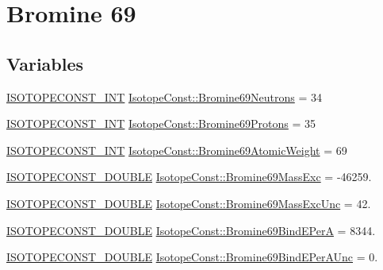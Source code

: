 \hypertarget{group___isotope_const-_bromine-_br69}{}\section{Bromine 69}
\label{group___isotope_const-_bromine-_br69}
\subsection*{Variables}
\begin{DoxyCompactItemize}
\item 
\mbox{\hyperlink{group___isotope_const-_macros_ga5f18360b3e99483a35c32d789e62621c}{I\+S\+O\+T\+O\+P\+E\+C\+O\+N\+S\+T\+\_\+\+I\+NT}} \mbox{\hyperlink{group___isotope_const-_bromine-_br69_ga08d0b6562bf87e6f8fb09f07b8b92cb9}{Isotope\+Const\+::\+Bromine69\+Neutrons}} = 34
\item 
\mbox{\hyperlink{group___isotope_const-_macros_ga5f18360b3e99483a35c32d789e62621c}{I\+S\+O\+T\+O\+P\+E\+C\+O\+N\+S\+T\+\_\+\+I\+NT}} \mbox{\hyperlink{group___isotope_const-_bromine-_br69_ga1dc3da21f07b641dfa9b4dcaabd54746}{Isotope\+Const\+::\+Bromine69\+Protons}} = 35
\item 
\mbox{\hyperlink{group___isotope_const-_macros_ga5f18360b3e99483a35c32d789e62621c}{I\+S\+O\+T\+O\+P\+E\+C\+O\+N\+S\+T\+\_\+\+I\+NT}} \mbox{\hyperlink{group___isotope_const-_bromine-_br69_gad3a682360bc514a4c93d0c40323c1738}{Isotope\+Const\+::\+Bromine69\+Atomic\+Weight}} = 69
\item 
\mbox{\hyperlink{group___isotope_const-_macros_ga8f45a7272ce02c0b4c65c44636ed719a}{I\+S\+O\+T\+O\+P\+E\+C\+O\+N\+S\+T\+\_\+\+D\+O\+U\+B\+LE}} \mbox{\hyperlink{group___isotope_const-_bromine-_br69_ga82f499cd47727569b32774b888214950}{Isotope\+Const\+::\+Bromine69\+Mass\+Exc}} = -\/46259.
\item 
\mbox{\hyperlink{group___isotope_const-_macros_ga8f45a7272ce02c0b4c65c44636ed719a}{I\+S\+O\+T\+O\+P\+E\+C\+O\+N\+S\+T\+\_\+\+D\+O\+U\+B\+LE}} \mbox{\hyperlink{group___isotope_const-_bromine-_br69_gae0127415d491404e24ffe682d15ed009}{Isotope\+Const\+::\+Bromine69\+Mass\+Exc\+Unc}} = 42.
\item 
\mbox{\hyperlink{group___isotope_const-_macros_ga8f45a7272ce02c0b4c65c44636ed719a}{I\+S\+O\+T\+O\+P\+E\+C\+O\+N\+S\+T\+\_\+\+D\+O\+U\+B\+LE}} \mbox{\hyperlink{group___isotope_const-_bromine-_br69_gaa401e2348880fcd368e2e4e1db254901}{Isotope\+Const\+::\+Bromine69\+Bind\+E\+PerA}} = 8344.
\item 
\mbox{\hyperlink{group___isotope_const-_macros_ga8f45a7272ce02c0b4c65c44636ed719a}{I\+S\+O\+T\+O\+P\+E\+C\+O\+N\+S\+T\+\_\+\+D\+O\+U\+B\+LE}} \mbox{\hyperlink{group___isotope_const-_bromine-_br69_ga5c2c42cfcd140446e30a69b82c9c69d5}{Isotope\+Const\+::\+Bromine69\+Bind\+E\+Per\+A\+Unc}} = 0.

\end{DoxyCompactItemize}

